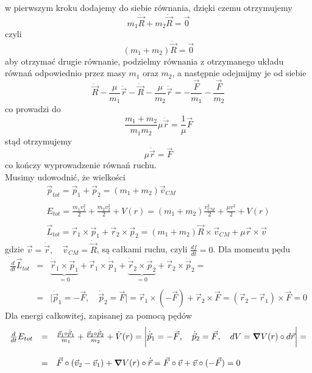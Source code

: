 \documentclass[a4paper,12pt]{article}
\begin{document}
	w pierwszym kroku dodajemy do siebie równania, dzięki czemu otrzymujemy
		$$
			m_1\ddot{\vec{R}} + m_2\ddot{\vec{R}} = \vec{0}
		$$
	czyli
		$$
			(m_1+m_2)\ddot{\vec{R}} = \vec{0}
		$$
	aby otrzymać drugie równanie, podzielmy równania z otrzymanego układu równań odpowiednio przez masy $m_1$ oraz $m_2$, a następnie odejmijmy je od siebie
		$$
			\ddot{\vec{R}} - \frac{\mu}{m_1}\ddot{\vec{r}} - \ddot{\vec{R}} - \frac{\mu}{m_2}\ddot{\vec{r}} = -\frac{\vec{F}}{m_1} - \frac{\vec{F}}{m_2}
		$$
	co prowadzi do
		$$
		\frac{m_1+m_2}{m_1 m_2}\mu \ddot{\vec{r}} = \frac{1}{\mu} \vec{F}
		$$
	stąd otrzymujemy
		$$
		\mu\ddot{\vec{r}} = \vec{F}
		$$
	co kończy wyprowadzenie równań ruchu.\\
	Musimy udowodnić, że wielkości
		$$
		\begin{array}{l}
			\vec{p}_{tot} = \vec{p}_1+\vec{p}_2=(m_1+m_2)\vec{v}_{CM}\\\\
			E_{tot} = \frac{m_1 v_1^2}{2}+\frac{m_2 v_2^2}{2} + V(r) = (m_1+m_2)\frac{v_{CM}^2}{2}+\frac{\mu v^2}{2} + V(r)\\\\
			\vec{L}_{tot} = \vec{r}_1\times\vec{p}_1 + \vec{r}_2\times\vec{p}_2 =  (m_1+m_2)\vec{R}\times\vec{v}_{CM}+\mu\vec{r}\times\vec{v}
		\end{array}
		$$
	gdzie $\vec{v}=\dot{\vec{r}},\quad \vec{v}_{CM} = \dot{\vec{R}}$, są
	całkami ruchu, czyli $\frac{d f}{dt}=0$. Dla momentu pędu
	$$
	\begin{array}{lll}
		\frac{d}{dt}\vec{L}_{tot} &=& \underbrace{\dot{\vec{r}}_1 \times\vec{p}_1}_{=0} + \vec{r}_1\times\dot{\vec{p}}_1 + \underbrace{\dot{\vec{r}}_2 \times\vec{p}_2}_{=0} + \vec{r}_2\times\dot{\vec{p}}_2 = \\\\
		&=&\bigg\vert \dot{\vec{p}}_1 = -\vec{F}, \quad \dot{\vec{p}}_2 = \vec{F} \bigg\vert = \vec{r}_1\times(-\vec{F})+\vec{r}_2\times\vec{F} = (\vec{r}_2-\vec{r}_1)\times \vec{F} = 0
	\end{array}
	$$
	Dla energi całkowitej, zapisanej za pomocą pędów 
	$$
	\begin{array}{lll}
		\frac{d}{dt}E_{tot} & = & \frac{\vec{p}_1\circ\ddot{\vec{p}}_1}{m_1} + \frac{\vec{p}_2\circ\ddot{\vec{p}}_2}{m_2} + \dot{V}(r) =
		\bigg\vert \dot{\vec{p}}_1 = -\vec{F}, \quad \dot{\vec{p}}_2 = \vec{F},\quad dV = \grad{V(r)}\circ d\vec{r} \bigg\vert =\\\\
		&=& \vec{F}\circ(\vec{v}_2-\vec{v}_1) + \grad{V(r)}\circ\dot{\vec{r}} = \vec{F}\circ \vec{v} + \vec{v}\circ(-\vec{F}) = 0
	\end{array}
	$$
\end{document}
